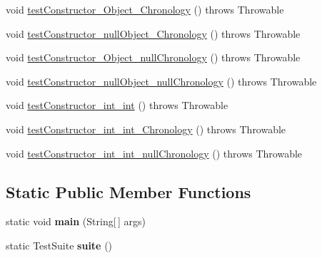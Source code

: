 \begin{DoxyCompactItemize}
\item 
void \hyperlink{classorg_1_1joda_1_1time_1_1_test_month_day___constructors_a26502bf03a0348c2ca4bb9d8a96e71ae}{test\-Constructor\-\_\-\-Object\-\_\-\-Chronology} ()  throws Throwable 
\item 
void \hyperlink{classorg_1_1joda_1_1time_1_1_test_month_day___constructors_a8133469e312cfb64bc8ccecace9e2454}{test\-Constructor\-\_\-null\-Object\-\_\-\-Chronology} ()  throws Throwable 
\item 
void \hyperlink{classorg_1_1joda_1_1time_1_1_test_month_day___constructors_ad41e735e3f77d05987d89fd2bf529a8a}{test\-Constructor\-\_\-\-Object\-\_\-null\-Chronology} ()  throws Throwable 
\item 
void \hyperlink{classorg_1_1joda_1_1time_1_1_test_month_day___constructors_a1e4e1247a42f60da68ba2f88b7941bdc}{test\-Constructor\-\_\-null\-Object\-\_\-null\-Chronology} ()  throws Throwable 
\item 
void \hyperlink{classorg_1_1joda_1_1time_1_1_test_month_day___constructors_aff1d5e846252e8453eb8a542f259a45f}{test\-Constructor\-\_\-int\-\_\-int} ()  throws Throwable 
\item 
void \hyperlink{classorg_1_1joda_1_1time_1_1_test_month_day___constructors_a28c4876ee75214fd09f4544d26fef1b6}{test\-Constructor\-\_\-int\-\_\-int\-\_\-\-Chronology} ()  throws Throwable 
\item 
void \hyperlink{classorg_1_1joda_1_1time_1_1_test_month_day___constructors_a2250a40a75f13b6a7cb52463d5f2fbcf}{test\-Constructor\-\_\-int\-\_\-int\-\_\-null\-Chronology} ()  throws Throwable 
\end{DoxyCompactItemize}
\subsection*{Static Public Member Functions}
\begin{DoxyCompactItemize}
\item 
\hypertarget{classorg_1_1joda_1_1time_1_1_test_month_day___constructors_a5081ec93cffff945ef98c7edde72bd9c}{static void {\bfseries main} (String\mbox{[}$\,$\mbox{]} args)}\label{classorg_1_1joda_1_1time_1_1_test_month_day___constructors_a5081ec93cffff945ef98c7edde72bd9c}

\item 
\hypertarget{classorg_1_1joda_1_1time_1_1_test_month_day___constructors_a2eac614e33e9a0dedadfdbc3a0ed6c44}{static Test\-Suite {\bfseries suite} ()}\label{classorg_1_1joda_1_1time_1_1_test_month_day___constructors_a2eac614e33e9a0dedadfdbc3a0ed6c44}

\end{DoxyCompactItemize}

